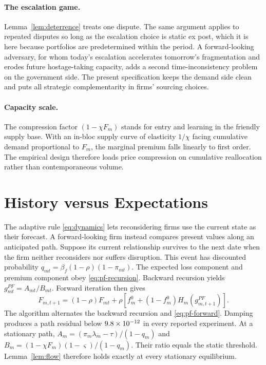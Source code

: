 \documentclass[11pt]{article}
\theoremstyle{definition}
\begin{document}
\paragraph{The escalation game.} Lemma~\ref{lem:deterrence} treats one dispute. The same argument applies to repeated disputes so long as the escalation choice is static ex post, which it is here because portfolios are predetermined within the period. A forward-looking adversary, for whom today's escalation accelerates tomorrow's fragmentation and erodes future hostage-taking capacity, adds a second time-inconsistency problem on the government side. The present specification keeps the demand side clean and puts all strategic complementarity in firms' sourcing choices.

\paragraph{Capacity scale.} The compression factor $(1-\chi F_m)$ stands for entry and learning in the friendly supply base. With an in-bloc supply curve of elasticity $1/\chi$ facing cumulative demand proportional to $F_m$, the marginal premium falls linearly to first order. The empirical design therefore loads price compression on cumulative reallocation rather than contemporaneous volume.

\section{History versus Expectations}\label{app:history}

The adaptive rule \eqref{eq:dynamics} lets reconsidering firms use the current state as their forecast. A forward-looking firm instead compares present values along an anticipated path. Suppose its current relationship survives to the next date when the firm neither reconsiders nor suffers disruption. This event has discounted probability $q_{mt}=\beta_f(1-\rho)(1-\pi_{mt})$. The expected loss component and premium component obey \eqref{eq:pf-recursion}. Backward recursion yields $g^{PF}_{mt}=A_{mt}/B_{mt}$. Forward iteration then gives
\begin{equation}
F_{m,t+1}=(1-\rho)F_{mt}+\rho\left[f_m^0+(1-f_m^0)H_m(g^{PF}_{m,t+1})\right].
\label{eq:pf-forward}
\end{equation}
The algorithm alternates the backward recursion and \eqref{eq:pf-forward}. Damping produces a path residual below \(9.8\times10^{-12}\) in every reported experiment. At a stationary path, $A_m=(\pi_m\lambda_m-\tau)/(1-q_m)$ and $B_m=(1-\chi F_m)(1-\varsigma)/(1-q_m)$. Their ratio equals the static threshold. Lemma~\ref{lem:flow} therefore holds exactly at every stationary equilibrium.
\end{document}
